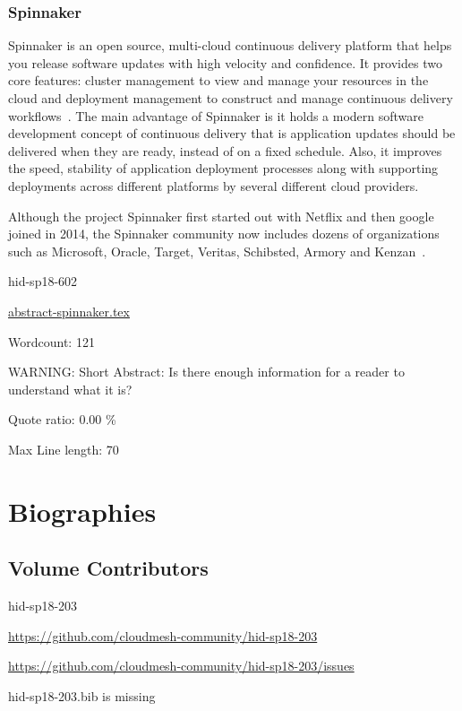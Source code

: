 \section{Spinnaker}

Spinnaker is an open source, multi-cloud continuous delivery platform
that helps you release software updates with high velocity and
confidence.  It provides two core features: cluster management to view
and manage your resources in the cloud and deployment management to
construct and manage continuous delivery
workflows~\cite{hid-sp18-602-www-spinnaker-io}. The main advantage of
Spinnaker is it holds a modern software development concept of
continuous delivery that is application updates should be delivered
when they are ready, instead of on a fixed schedule.  Also, it
improves the speed, stability of application deployment processes
along with supporting deployments across different platforms by
several different cloud providers.

Although the project Spinnaker first started out with Netflix and then
google joined in 2014, the Spinnaker community now includes dozens of
organizations such as Microsoft, Oracle, Target, Veritas,
Schibsted, Armory and Kenzan~\cite{hid-sp18-602-www-spinnaker-gc}.



\begin{IU}

hid-sp18-602

\href{https://github.com/cloudmesh-community/hid-sp18-602/blob/master//technology/abstract-spinnaker.tex}{abstract-spinnaker.tex}

 

Wordcount: 121

WARNING: Short Abstract: Is there enough information for a reader to understand what it is?


Quote ratio: 0.00 \%
 
Max Line length: 70
\end{IU}

\part{Biographies}
\chapter{Volume Contributors}


\begin{IU}

hid-sp18-203

\url{https://github.com/cloudmesh-community/hid-sp18-203}

\url{https://github.com/cloudmesh-community/hid-sp18-203/issues}

hid-sp18-203.bib is missing

\end{IU}


